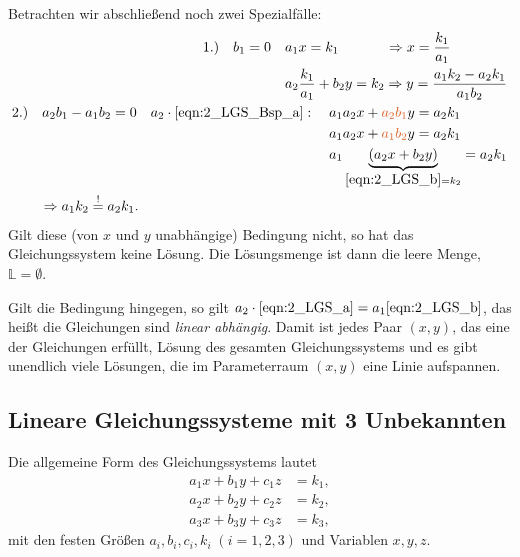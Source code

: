 Betrachten wir abschließend noch zwei Spezialfälle: 
\begin{align}
    \begin{split}
        &1.)\quad b_1 = 0  \quad a_1 x = k_1 \hphantom{\frac{k_1}{a_1} + b_2}\Rightarrow x = \frac{k_1}{a_1} \\
        &\hphantom{1.)\quad b_1 = 0 } \quad a_2 \frac{k_1}{a_1} + b_2 y = k_2 \Rightarrow y = \frac{a_1 k_2 - a_2 k_1}{a_1 b_2}
    \end{split}\\
    \begin{split}
        &2.)\quad a_2 b_1 - a_1 b_2 = 0 \quad a_2 \cdot \eqref{eqn:2_LGS_Bsp_a}: \quad a_1 a_2 x + \textcolor{PAForange}{a_2 b_1} y = a_2 k_1 \\
        &\hphantom{2.)\quad a_2 b_1 - a_1 b_2 = 0 \quad a_2 \cdot \eqref{eqn:2_LGS_Bsp_a}:}\quad\; a_1 a_2 x + \textcolor{PAForange}{a_1 b_2}y = a_2 k_1  \\
        &\hphantom{2.)\quad a_2 b_1 - a_1 b_2 = 0 \quad a_2 \cdot \eqref{eqn:2_LGS_Bsp_a}:}\quad\; a_1 \underbrace{(a_2 x + b_2 y)}_{\eqref{eqn:2_LGS_b} = k_2} = a_2 k_1 \\
        &\qquad \Rightarrow a_1 k_2 \overset{!}{=} a_2 k_1.
    \end{split}
\end{align}
Gilt diese (von $x$ und $y$ unabhängige) Bedingung nicht, so hat das Gleichungssystem keine Lösung. Die Lösungsmenge ist dann die leere Menge, $\mathbb{L} = \emptyset$. 

Gilt die Bedingung hingegen, so gilt $a_2 \cdot \eqref{eqn:2_LGS_a} = a_1 \eqref{eqn:2_LGS_b}$, das heißt die Gleichungen sind \emph{linear abhängig}. Damit ist jedes Paar $(x,y)$, das eine der Gleichungen erfüllt, Lösung des gesamten Gleichungssystems und es gibt unendlich viele Lösungen, die im Parameterraum $(x,y)$ eine Linie aufspannen. 

\newpage
\subsection{Lineare Gleichungssysteme mit 3 Unbekannten}

Die allgemeine Form des Gleichungssystems lautet 
\begin{subequations}
    \begin{align}
        a_1 x + b_1 y + c_1 z &= k_1, \label{eqn:2_LGS_3a}\\
        a_2 x + b_2 y + c_2 z &= k_2, \label{eqn:2_LGS_3b}\\
        a_3 x + b_3 y + c_3 z &= k_3, \label{eqn:2_LGS_3c}
    \end{align}
\end{subequations}
mit den festen Größen $a_i, b_i, c_i, k_i \; (i=1,2,3)$ und Variablen $x,y,z$. 

